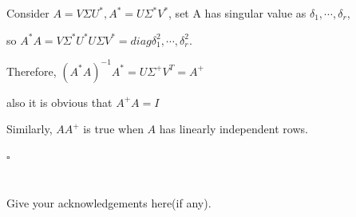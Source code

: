 \documentclass[a4paper]{article}
\begin{document}
Consider $A = V\varSigma U^{*}, A^{*} = U \varSigma^{*} V^{*}$, set A has singular value as $\delta _{1}, \cdots, \delta _{r}$, 

so $A^{*}A = V\varSigma^{*}U^{*}U\varSigma V^{*} = diag{\delta _{1}^{2},\cdots,\delta _{r}^{2}}$.

Therefore, $(A^{*}A)^{-1}A^{*} = U\varSigma^{+} V^{T} = A^{+}$

also it is obvious that $A^{+}A = I$

Similarly, $AA^{+}$ is true when $A$ has linearly independent rows.
\begin{flushright} %
  $\square$ 
\end{flushright} 

\section*{  }
Give your acknowledgements here(if any).
\end{document}
